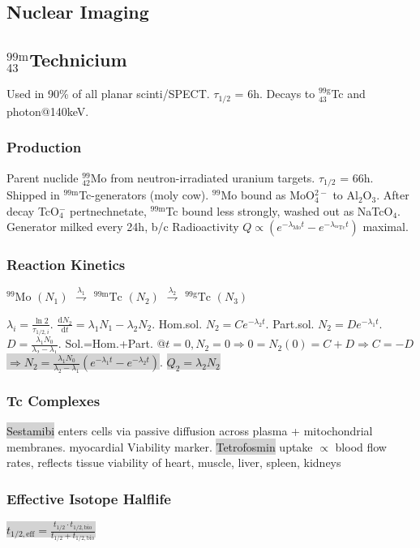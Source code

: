 \documentclass[9pt]{article}
\newcommand{\grey}[1]{\setlength{\fboxsep}{0pt}\colorbox{lightgrey}{#1}}
\newcommand{\dif}{\mathrm{d}}
\begin{document}
\begin{multicols}{2}
\section{Nuclear Imaging}
\subsection{${}^{99\mathrm{m}}_{43}$Technicium}
Used in 90\% of all planar scinti/SPECT. $\tau_{1/2}$ = 6h. Decays to ${}^{99\mathrm{g}}_{43}$Tc and photon@140keV.

\subsubsection{Production}
Parent nuclide ${}^{99}_{42}$Mo from neutron-irradiated uranium targets. $\tau_{1/2}$ = 66h. Shipped in ${}^{99\mathrm{m}}$Tc-generators (moly cow). ${}^{99}$Mo bound as MoO${}_4^{2-}$ to Al${}_2$O${}_3$. After decay TcO${}_4^{-}$ pertnechnetate, ${}^{99\mathrm{m}}$Tc bound less strongly, washed out as  NaTcO${}_4$. Generator milked every 24h, b/c Radioactivity $Q\propto(e^{-\lambda_\mathrm{Mo}t} - e^{-\lambda_\mathrm{{}^mTc}t})$ maximal.

\subsubsection{Reaction Kinetics}
${{}^{99}\mathrm{Mo}}$ $(N_1)$ $\overset{\lambda_1}{\rightharpoondown}$ ${{}^{99\mathrm{m}}\mathrm{Tc}}$ $(N_2)$ $\overset{\lambda_2}{\rightharpoondown}$ ${{}^{99\mathrm{g}}\mathrm{Tc}}$ $(N_3)$

$\lambda_i = \frac{\ln2}{\tau_{1/2, i}}$. $\frac{\dif N_2}{\dif t} = \lambda_1N_1-\lambda_2N_2$. Hom.sol. $N_2=Ce^{-\lambda_2t}$. Part.sol. $N_2=De^{-\lambda_1t}$. $D=\frac{\lambda_1N_0}{\lambda_2-\lambda_1}$. Sol.=Hom.+Part. @$t=0, N_2=0 \Rightarrow 0=N_2(0)=C+D \Rightarrow C=-D$ 
\grey{$\Rightarrow N_2 = \frac{\lambda_1N_0}{\lambda_2-\lambda_1}(e^{-\lambda_1t}-e^{-\lambda_2t})$}.
\grey{$Q_2 = \lambda_2N_2$}

\subsubsection{Tc Complexes}
\grey{Sestamibi} enters cells via passive diffusion across plasma + mitochondrial membranes. myocardial Viability marker.
\grey{Tetrofosmin} uptake $\propto$ blood flow rates, reflects tissue viability of heart, muscle, liver, spleen, kidneys

\subsubsection{Effective Isotope Halflife} \grey{$t_{1/2,\mathrm{eff}} = \frac{t_{1/2} \cdot t_{1/2,\mathrm{bio}}}{t_{1/2} + t_{1/2,\mathrm{bio}}}$}


\end{multicols}
\end{document}
